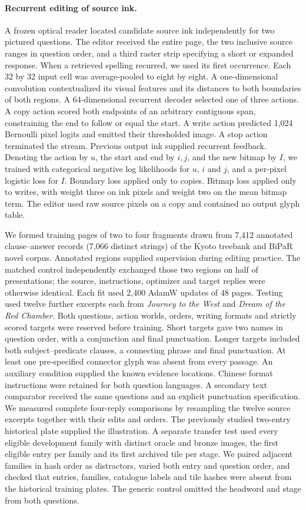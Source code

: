 \paragraph{Recurrent editing of source ink.}
A frozen optical reader located candidate source ink independently for two pictured questions. The editor received the entire page, the two inclusive source ranges in question order, and a third raster strip specifying a short or expanded response. When a retrieved spelling recurred, we used its first occurrence. Each 32 by 32 input cell was average-pooled to eight by eight. A one-dimensional convolution contextualized its visual features and its distances to both boundaries of both regions. A 64-dimensional recurrent decoder selected one of three actions. A copy action scored both endpoints of an arbitrary contiguous span, constraining the end to follow or equal the start. A write action predicted 1,024 Bernoulli pixel logits and emitted their thresholded image. A stop action terminated the stream. Previous output ink supplied recurrent feedback. Denoting the action by $u$, the start and end by $i,j$, and the new bitmap by $I$, we trained with categorical negative log likelihoods for $u$, $i$ and $j$, and a per-pixel logistic loss for $I$. Boundary loss applied only to copies. Bitmap loss applied only to writes, with weight three on ink pixels and weight two on the mean bitmap term. The editor used raw source pixels on a copy and contained no output glyph table.

We formed training pages of two to four fragments drawn from 7,412 annotated clause--answer records (7,066 distinct strings) of the Kyoto treebank and BiPaR novel corpus. Annotated regions supplied supervision during editing practice. The matched control independently exchanged those two regions on half of presentations; the source, instructions, optimizer and target replies were otherwise identical. Each fit used 2,400 AdamW updates of 48 pages. Testing used twelve further excerpts each from \textit{Journey to the West} and \textit{Dream of the Red Chamber}. Both questions, action worlds, orders, writing formats and strictly scored targets were reserved before training. Short targets gave two names in question order, with a conjunction and final punctuation. Longer targets included both subject--predicate clauses, a connecting phrase and final punctuation. At least one pre-specified connector glyph was absent from every passage. An auxiliary condition supplied the known evidence locations. Chinese format instructions were retained for both question languages. A secondary text comparator received the same questions and an explicit punctuation specification. We measured complete four-reply comparisons by resampling the twelve source excerpts together with their edits and orders. The previously studied two-entry historical plate supplied the illustration. A separate transfer test used every eligible development family with distinct oracle and bronze images, the first eligible entry per family and its first archived tile per stage. We paired adjacent families in hash order as distractors, varied both entry and question order, and checked that entries, families, catalogue labels and tile hashes were absent from the historical training plates. The generic control omitted the headword and stage from both questions.
